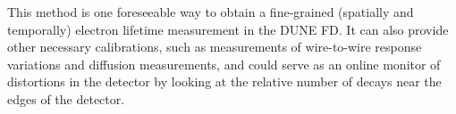 
This method is one foreseeable way to obtain a fine-grained (spatially and temporally) electron lifetime measurement in the DUNE FD.  It can also provide other necessary calibrations, such as measurements of wire-to-wire response variations and diffusion measurements, 
and could serve as an online monitor of 
\efield distortions in the detector by looking at the relative number of decays 
near the edges of the 
detector.  

